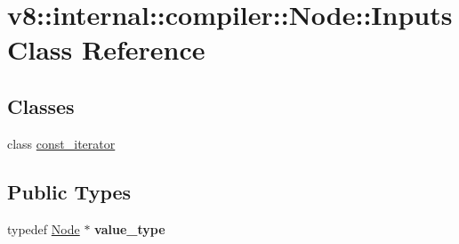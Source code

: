 \hypertarget{classv8_1_1internal_1_1compiler_1_1_node_1_1_inputs}{}\section{v8\+:\+:internal\+:\+:compiler\+:\+:Node\+:\+:Inputs Class Reference}
\label{classv8_1_1internal_1_1compiler_1_1_node_1_1_inputs}
\subsection*{Classes}
\begin{DoxyCompactItemize}
\item 
class \hyperlink{classv8_1_1internal_1_1compiler_1_1_node_1_1_inputs_1_1const__iterator}{const\+\_\+iterator}
\end{DoxyCompactItemize}
\subsection*{Public Types}
\begin{DoxyCompactItemize}
\item 
typedef \hyperlink{classv8_1_1internal_1_1compiler_1_1_node}{Node} $\ast$ {\bfseries value\+\_\+type}\hypertarget{classv8_1_1internal_1_1compiler_1_1_node_1_1_inputs_a62c3a723281a100d5ede0068f92e33f6}{}\label{classv8_1_1internal_1_1compiler_1_1_node_1_1_inputs_a62c3a723281a100d5ede0068f92e33f6}

\end{DoxyCompactItemize}

